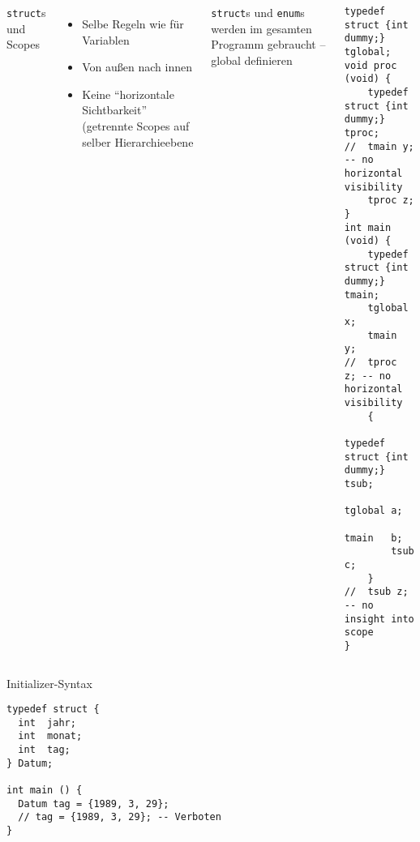 \begin{frame}[t,fragile]%
%
\begin{columns}[T]
\begin{Large}
\texttt{struct}s und Scopes
\vspace{10pt}
\end{Large}
%
\begin{itemize}
\item Selbe Regeln wie für Variablen
\item Von außen nach innen
\item Keine \enquote{horizontale Sichtbarkeit} (getrennte Scopes auf selber Hierarchieebene
\end{itemize}
%
\begin{hintbox}
\texttt{struct}s und \texttt{enum}s werden \idR im gesamten Programm gebraucht -- global definieren
\end{hintbox}
%
\begin{codebox}
\begin{verbatim}
typedef struct {int dummy;} tglobal;
void proc (void) {
    typedef struct {int dummy;} tproc;
//  tmain y;  -- no horizontal visibility
    tproc z;
}
int main (void) {
    typedef struct {int dummy;} tmain;
    tglobal x;
    tmain   y;
//  tproc   z; -- no horizontal visibility
    {
        typedef struct {int dummy;} tsub;
        tglobal a;
        tmain   b;
        tsub    c;
    }
//  tsub z;  -- no insight into scope
}
\end{verbatim}
\end{codebox}
\end{columns}

%
\end{frame}


\begin{frame}[fragile]{Initializer-Syntax}
%
\begin{codebox}
\begin{verbatim}
typedef struct {
  int  jahr;
  int  monat;
  int  tag;
} Datum;

int main () {
  Datum tag = {1989, 3, 29};
  // tag = {1989, 3, 29}; -- Verboten
}
\end{verbatim}
\end{codebox}
%
\end{frame}


